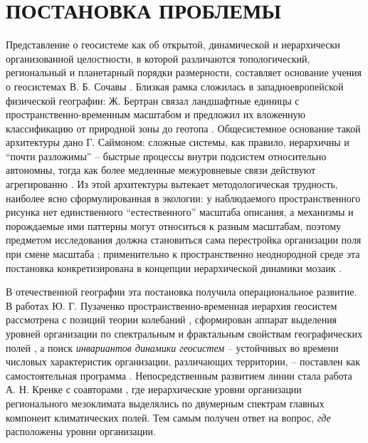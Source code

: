 \documentclass[12pt,a4paper]{article}
\begin{document}
\section{ПОСТАНОВКА ПРОБЛЕМЫ}

Представление о геосистеме как об открытой, динамической и иерархически организованной целостности, в которой различаются топологический, региональный и планетарный порядки размерности, составляет основание учения о геосистемах В. Б. Сочавы \cite{Sochava1978}. Близкая рамка сложилась в западноевропейской физической географии: Ж. Бертран связал ландшафтные единицы с пространственно-временным масштабом и предложил их вложенную классификацию от природной зоны до геотопа \cite{Bertrand1968}. Общесистемное основание такой архитектуры дано Г. Саймоном: сложные системы, как правило, иерархичны и “почти разложимы” -- быстрые процессы внутри подсистем относительно автономны, тогда как более медленные межуровневые связи действуют агрегированно \cite{Simon1962}. Из этой архитектуры вытекает методологическая трудность, наиболее ясно сформулированная в экологии: у наблюдаемого пространственного рисунка нет единственного “естественного” масштаба описания, а механизмы и порождаемые ими паттерны могут относиться к разным масштабам, поэтому предметом исследования должна становиться сама перестройка организации поля при смене масштаба \cite{Levin1992}; применительно к пространственно неоднородной среде эта постановка конкретизирована в концепции иерархической динамики мозаик \cite{WuLoucks1995}.

В отечественной географии эта постановка получила операциональное развитие. В работах Ю. Г. Пузаченко пространственно-временная иерархия геосистем рассмотрена с позиций теории колебаний \cite{Puzachenko1986}, сформирован аппарат выделения уровней организации по спектральным и фрактальным свойствам географических полей \cite{Puzachenko2004}, а поиск \emph{инвариантов динамики геосистем} -- устойчивых во времени числовых характеристик организации, различающих территории, -- поставлен как самостоятельная программа \cite{Puzachenko2010}. Непосредственным развитием линии стала работа А. Н. Кренке с соавторами \cite{Krenke2019}, где иерархические уровни организации регионального мезоклимата выделялись по двумерным спектрам главных компонент климатических полей. Тем самым получен ответ на вопрос, \emph{где} расположены уровни организации.
\end{document}
